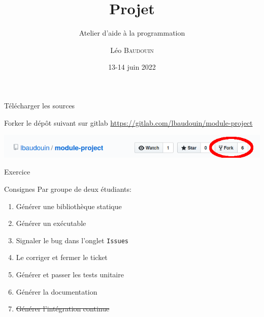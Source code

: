\documentclass{beamer}
\title{Projet}
\subtitle{Atelier d'aide à la programmation}
\author{L\'eo \textsc{Baudouin}}
\institute{
  {\url{baudouin.leo @ gmail.com}}
}
\date{13-14 juin 2022}
\begin{document}
\begin{frame}
  \titlepage
\end{frame}


\section{}
\subsection{}

\begin{frame}[fragile]{Télécharger les sources}
  \begin{block}{Forker le dép\^ot suivant sur gitlab}
    \url{https://gitlab.com/lbaudouin/module-project}
  \end{block}
  
\includegraphics[width=\linewidth]{images/fork.png}  
  
\end{frame}

\begin{frame}[fragile]{Exercice}  
    \begin{exampleblock}{Consignes}
	Par groupe de deux étudiants:
    \begin{enumerate}
    \item Générer une bibliothèque statique
    \item Générer un exécutable
    \item Signaler le bug dans l'onglet \verb?Issues?
    \item Le corriger et fermer le ticket
    \item Générer et passer les tests unitaire
    \item Générer la documentation
    \item \sout{Générer l'intégration continue}
    \end{enumerate}
  \end{exampleblock}
\end{frame}

\end{document}
